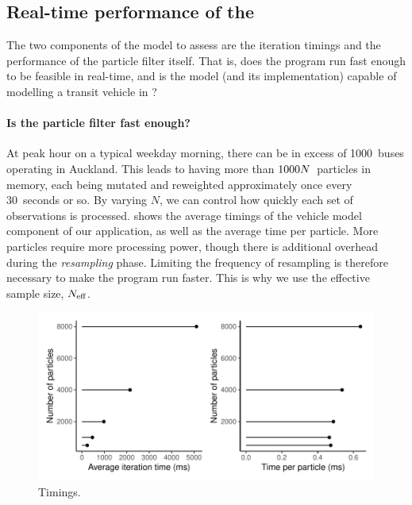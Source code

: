 \subsection{Real-time performance of the \pf{}}
\label{sec:pf_issues}



The two components of the model to assess are the iteration timings and the performance of the particle filter itself. That is, does the program run fast enough to be feasible in real-time, and is the model (and its \pf{} implementation) capable of modelling a transit vehicle in \rt{}?


\paragraph{Is the particle filter fast enough?}
At peak hour on a typical weekday morning, there can be in excess of 1000~buses operating in Auckland. This leads to having more than $1000N$~particles in memory, each being mutated and reweighted approximately once every 30~seconds or so. By varying $N$, we can control how quickly each set of observations is processed.  shows the average timings of the vehicle model component of our application, as well as the average time per particle. More particles require more processing power, though there is additional overhead during the \emph{resampling} phase. Limiting the frequency of resampling is therefore necessary to make the program run faster. This is why we use the effective sample size, $N_\text{eff}$.


\begin{knitrout}\small
{}\color{fgcolor}\begin{figure}

{\centering \includegraphics[width=.8\textwidth]{figure/pf_timings-1} 

}

\caption[Timings]{Timings.}\label{fig:pf_timings}
\end{figure}


\end{knitrout}


